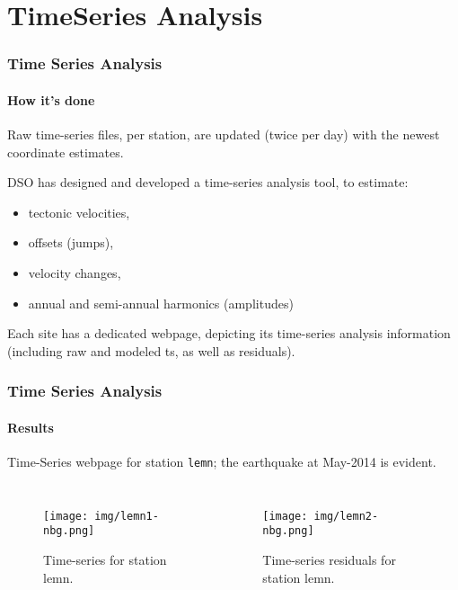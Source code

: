 \documentclass{beamer}
\begin{document}
\section{TimeSeries Analysis}

\begin{frame}\frametitle{Time Series Analysis}\framesubtitle{How it's done}

    Raw time-series files, per station, are updated (twice per day) with the newest coordinate estimates.

    DSO has designed and developed a time-series analysis tool, to estimate:
    \begin{itemize}
    \item tectonic velocities,
    \item offsets (jumps),
    \item velocity changes,
    \item annual and semi-annual harmonics (amplitudes)
    \end{itemize}

    Each site has a dedicated webpage, depicting its time-series analysis information 
    (including raw and modeled ts, as well as residuals).

\end{frame}

\begin{frame}\frametitle{Time Series Analysis}\framesubtitle{Results}

    Time-Series webpage for station \texttt{lemn}; the earthquake at May-2014 is evident.

  \begin{columns}
    \begin{figure}
        \begin{center}
        \texttt{[image: img/lemn1-nbg.png]}
        \caption{Time-series for station lemn.}
        \label{fig:mits}
        \end{center}
    \end{figure}
    \begin{figure}
        \begin{center}
        \texttt{[image: img/lemn2-nbg.png]}
        \caption{Time-series residuals for station lemn.}
        \label{fig:mits}
        \end{center}
    \end{figure}
  \end{columns}

\end{frame}
\end{document}
